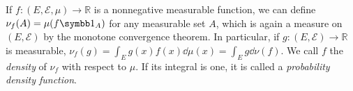 \begin{example}
	If \( f \colon (E, \mathcal E, \mu) \to \mathbb R \) is a nonnegative measurable function, we can define \( \nu_f(A) = \mu(f \symbb 1_A) \) for any measurable set \( A \), which is again a measure on \( (E, \mathcal E) \) by the monotone convergence theorem.
	In particular, if \( g \colon (E, \mathcal E) \to \mathbb R \) is measurable, \( \nu_f(g) = \int_E g(x) f(x) \dd{\mu(x)} = \int_E g \dd{\nu(f)} \).
	We call \( f \) the \emph{density} of \( \nu_f \) with respect to \( \mu \).
	If its integral is one, it is called a \emph{probability density function}.
\end{example}
